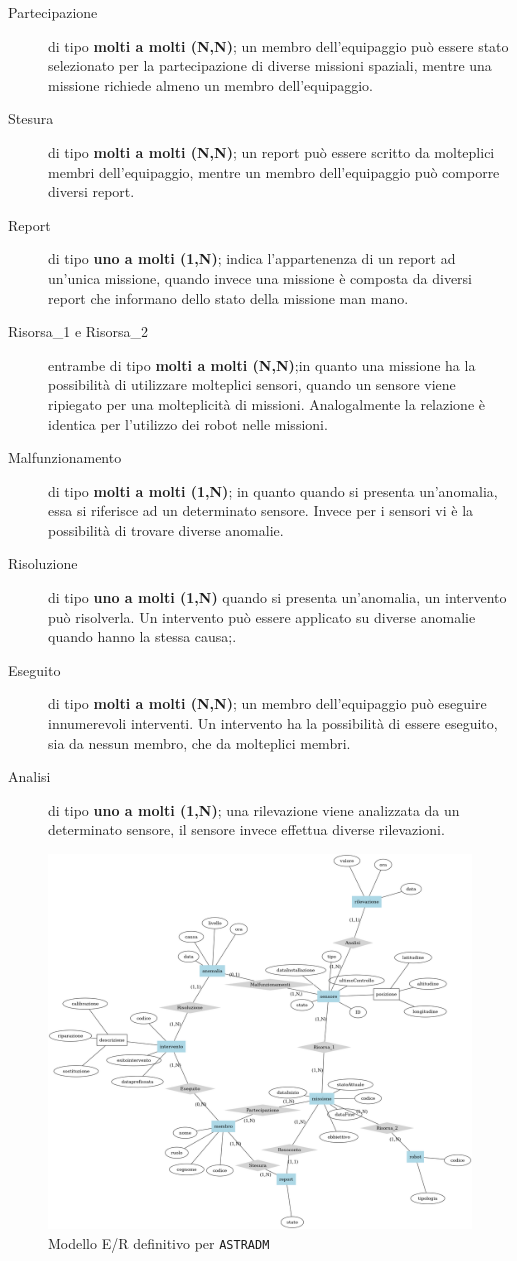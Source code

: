 \begin{description}
\item[Partecipazione] di tipo \textbf{molti a molti (N,N)}; un membro
  dell'equipaggio può essere stato selezionato per la partecipazione
  di diverse missioni spaziali, mentre una missione richiede almeno un
  membro dell'equipaggio.
\item[Stesura] di tipo \textbf{molti a molti (N,N)}; un report può
  essere scritto da molteplici membri dell'equipaggio, mentre un
  membro dell'equipaggio può comporre diversi report.
\item[Report] di tipo \textbf{uno a molti (1,N)}; indica
  l'appartenenza di un report ad un'unica missione, quando invece una
  missione è composta da diversi report che informano dello stato
  della missione man mano.
\item[Risorsa\_1 e Risorsa\_2] entrambe di tipo \textbf{molti a molti
  (N,N)};in quanto una missione ha la possibilità di utilizzare
  molteplici sensori, quando un sensore viene ripiegato per una
  molteplicità di missioni. Analogalmente la relazione è identica per
  l'utilizzo dei robot nelle missioni.
\item[Malfunzionamento] di tipo \textbf{molti a molti (1,N)};
  in quanto quando si presenta un'anomalia, essa si riferisce ad un
  determinato sensore. Invece per i sensori vi è la possibilità di
  trovare diverse anomalie.
\item[Risoluzione] di tipo \textbf{uno a molti (1,N)} quando
  si presenta un'anomalia, un intervento può risolverla. Un intervento
  può essere applicato su diverse anomalie quando hanno la stessa
  causa;.
\item[Eseguito] di tipo \textbf{molti a molti (N,N)}; un
  membro dell'equipaggio può eseguire innumerevoli interventi. Un
  intervento ha la possibilità di essere eseguito, sia da nessun
  membro, che da molteplici membri.
\item[Analisi] di tipo \textbf{uno a molti (1,N)}; una
  rilevazione viene analizzata da un determinato sensore, il sensore
  invece effettua diverse rilevazioni.
\end{description}

\begin{figure}[ht]
  \centering
  \includegraphics[width=\linewidth]{images/er.png}
  \caption{Modello E/R definitivo per \texttt{ASTRADM}}
  \label{fig:er}
\end{figure}
